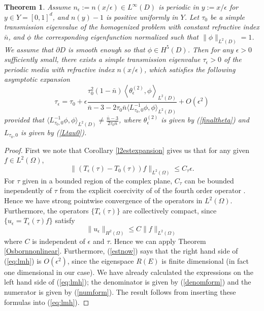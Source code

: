 \documentclass[10pt,a4paper]{amsart}
\newtheorem{theorem}{Theorem}
\begin{document}
\begin{theorem}
 Assume $n_\epsilon:=n(x/\epsilon)\in L^\infty(D)$ is periodic in $y:=x/\epsilon$ for $y\in Y= [0,1]^d$, and  $n(y)-1$ is positive uniformly in $Y$. Let $\tau_0$ be a simple transmission eigenvalue of the homogenized problem with constant refractive index $\bar n$, and $\phi$ the corresponding eigenfunction normalized such that $\|\phi\|_{L^2(D)}=1$. We assume that $\partial D$ is smooth enough so that $\phi\in H^5(D)$. Then for any $\epsilon>0$ sufficiently small, there exists a simple transmission eigenvalue $\tau_\epsilon>0$ of the periodic media with refractive index $n(x/\epsilon)$, which satisfies the following asymptotic expansion
 \begin{equation}\label{correctedeig}
 \tau_\epsilon=\tau_0+\epsilon\frac{\tau_0^2(1-\bar n)\left<\theta_\epsilon^{(2)}, \phi\right>_{L^2(D)}}{\bar n-3-2\tau_0\bar n \langle L^{-1}_{\tau_0,0}\phi,\phi\rangle_{L^2(D)}}+O(\epsilon^2)
 \end{equation} provided that $\langle L^{-1}_{\tau_0,0}\phi,\phi\rangle_{L^2(D)}\neq \frac{\bar n-3}{2\tau_0\bar n}$,  where $\theta_\epsilon^{(2)}$ is given by (\ref{finaltheta}) and $L_{\tau_0,0}$ is given by (\ref{Ltau0}).
\end{theorem}

\begin{proof}
First we note that Corollary  \ref{l2estexpansion} gives us that for any given $f\in L^2(\Omega)$, \begin{equation} \label{estnow} \| (T_\epsilon(\tau) - T_0(\tau) ) f \|_{L^2(\Omega)} \leq C_\tau \epsilon.\end{equation}  For $\tau$ given in a bounded region of the complex plane, $C_\tau$ can be bounded inependently of $\tau$  from the explicit coercivity of of the fourth order operator \cite{CaHa}. Hence we have strong pointwise convergence of the operators in $L^2(\Omega)$. Furthermore, the operators $\{ T_\epsilon (\tau) \} $ are collectively compact, since $\{ u_\epsilon= T_\epsilon (\tau) f \} $ satisfy $$ \| u_\epsilon \|_{H^2(\Omega)} \leq C \| f\|_{L^2(\Omega)} $$ where $C$ is independent of $\epsilon$ and $\tau$. Hence we can apply Theorem \ref{Osbornnonlinear}. Furthermore, (\ref{estnow}) says that the right hand side of (\ref{eq:lmh}) is $O(\epsilon^2)$, since the eigenspace $R(E)$ is finite dimensional (in fact one dimensional in our case).  We have already calculated the expressions on the left hand side of (\ref{eq:lmh}); the denominator is given by (\ref{denomform}) and the numerator is given by (\ref{numform}).  The result follows from inserting these formulas into (\ref{eq:lmh}). 
\end{proof}
\end{document}
